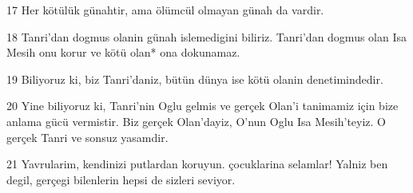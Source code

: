 \par 17 Her kötülük günahtir, ama ölümcül olmayan günah da vardir.
\par 18 Tanri'dan dogmus olanin günah islemedigini biliriz. Tanri'dan dogmus olan Isa Mesih onu korur ve kötü olan* ona dokunamaz.
\par 19 Biliyoruz ki, biz Tanri'daniz, bütün dünya ise kötü olanin denetimindedir.
\par 20 Yine biliyoruz ki, Tanri'nin Oglu gelmis ve gerçek Olan'i tanimamiz için bize anlama gücü vermistir. Biz gerçek Olan'dayiz, O'nun Oglu Isa Mesih'teyiz. O gerçek Tanri ve sonsuz yasamdir.
\par 21 Yavrularim, kendinizi putlardan koruyun. çocuklarina selamlar! Yalniz ben degil, gerçegi bilenlerin hepsi de sizleri seviyor.


